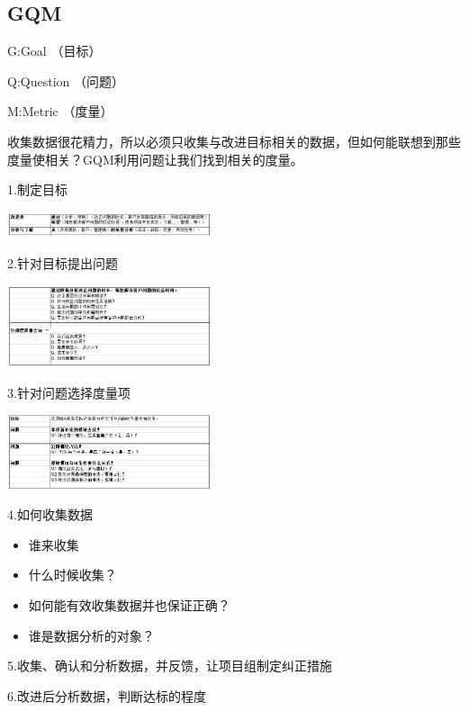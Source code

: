 \hypertarget{gqm}{%
\subsection{GQM}\label{gqm}}

\begin{description}
\tightlist
\item[]
G:Goal （目标）

Q:Question （问题）

M:Metric （度量）
\end{description}

收集数据很花精力，所以必须只收集与改进目标相关的数据，但如何能联想到那些度量使相关？GQM利用问题让我们找到相关的度量。

1.制定目标

\includegraphics[width=6cm]{Gqm1Screenshot_2023-11-01_113815.jpg}

2.针对目标提出问题

\includegraphics[width=6cm]{Gqm2Screenshot_2023-11-01_114014.jpg}

3.针对问题选择度量项

\includegraphics[width=6cm]{Gqm3Screenshot_2023-11-01_114048.jpg}

4.如何收集数据

\begin{itemize}
\tightlist
\item
  谁来收集
\item
  什么时候收集？
\item
  如何能有效收集数据并也保证正确？
\item
  谁是数据分析的对象？
\end{itemize}

5.收集、确认和分析数据，并反馈，让项目组制定纠正措施

6.改进后分析数据，判断达标的程度

